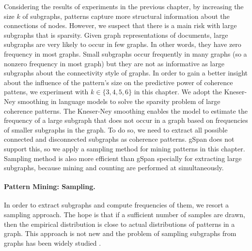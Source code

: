 Considering the results of experiments in the previous chapter, 
by increasing the size $k$ of subgraphs, patterns capture more
structural information about the connections of nodes. 
However, we suspect that there is a main risk with large subgraphs that is sparsity. 
Given graph representations of documents, large subgraphs are very likely to  occur in few graphs.  
In other words, they have zero frequency in most graphs. 
Small subgraphs occur frequently in many graphs (so a nonzero frequency in most graph) but
they are not as informative as large subgraphs about the
connectivity style of graphs. 
In order to gain a better insight about the influence of the pattern's size on the predictive power of coherence pattens, we experiment with $k \in \{3,4,5,6\}$ in this chapter.   
We adopt the \mbox{Kneser-Ney} smoothing in language models \cite{heafield13} to solve the sparsity problem of large coherence patterns. 
The \mbox{Kneser-Ney} smoothing enables the model to estimate the frequency of a large subgraph that does not occur in a graph based on frequencies of smaller subgraphs in the graph. 
To do so, we need to extract all possible connected and disconnected \knode subgraphs as coherence patterns.  
gSpan does not support this, so we apply a sampling method for  mining patterns in this chapter. 
Sampling method is also more efficient than gSpan specially for extracting large subgraphs, because mining and counting are performed at simultaneously.  

\paragraph{Pattern Mining: Sampling. }
In order to extract \knode subgraphs and compute frequencies of them, we resort a sampling approach.  
The hope is that if a sufficient number of samples are drawn, then the empirical distribution is close to actual distributions of patterns in a graph. 
This approach is not new and the problem of sampling subgraphs from graphs has been widely studied \cite{weissman03,shervashidze09}. 
%

